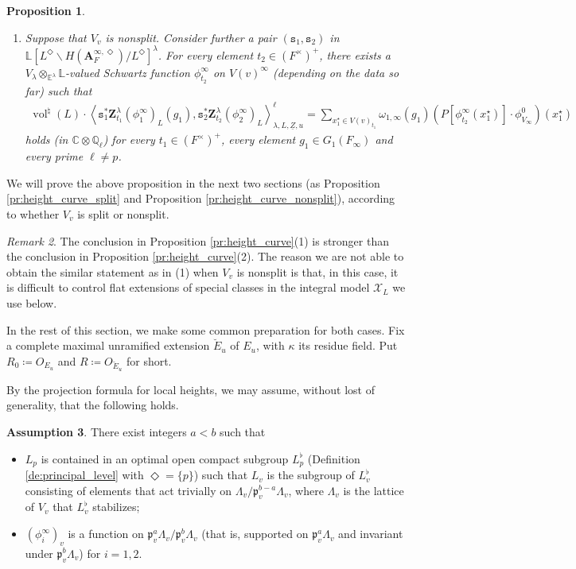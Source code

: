 \documentclass[12pt]{amsart}
\numberwithin{equation}{section}
\theoremstyle{plain}
\newtheorem{proposition}{Proposition}[section]
\theoremstyle{definition}
\newtheorem{assumption}[proposition]{Assumption}
\theoremstyle{remark}
\newtheorem{remark}[proposition]{Remark}
\renewcommand{\b}[1]{\mathbf{#1}}
\renewcommand{\c}[1]{\mathcal{#1}}
\renewcommand{\d}[1]{\mathbb{#1}}
\newcommand{\f}[1]{\mathfrak{#1}}
\renewcommand{\(}{\left(}
\renewcommand{\)}{\right)}
\newcommand{\ul}{\underline}
\newcommand{\bA}{\b A}
\newcommand{\cX}{\c X}
\newcommand{\dC}{\d C}
\newcommand{\dE}{\d E}
\newcommand{\dL}{\d L}
\newcommand{\dQ}{\d Q}
\newcommand{\fp}{\f p}
\newcommand{\ts}{\mathtt{s}}
\newcommand{\bbZ}{\boldsymbol{Z}}
\newcommand{\llangle}{\left\langle}
\newcommand{\rrangle}{\right\rangle}
\DeclareMathOperator{\vol}{vol}
\begin{document}
\begin{proposition}
\begin{enumerate}
  \item Suppose that $V_v$ is nonsplit. Consider further a pair $(\ts_1,\ts_2)$ in $\dL[L^\Diamond\backslash H(\bA_F^{\infty,\Diamond})/L^\Diamond]^\lambda$. For every element $t_2\in(F^\times)^+$, there exists a $V_\lambda\otimes_{\dE^\lambda}\dL$-valued Schwartz function $\phi^\infty_{t_2}$ on $V(v)^\infty$ (depending on the data so far) such that
      \begin{align*}
      \vol^\natural(L)\cdot
      \llangle\ts_1^*\bbZ^\lambda_{t_1}(\phi^\infty_1)_L(g_1),
      \ts_2^*\bbZ^\lambda_{t_2}(\phi^\infty_2)_L\rrangle_{\lambda,L,\ul{Z},u}^\ell
      =\sum_{x^\star_1\in V(v)_{t_1}}\omega_{1,\infty}(g_1)\(P[\phi^\infty_{t_2}(x^\star_1)]\cdot\phi^0_{V_\infty}\)(x^\star_1)
      \end{align*}
      holds (in $\dC\otimes\dQ_\ell$) for every $t_1\in(F^\times)^+$, every element $g_1\in G_1(F_\infty)$ and every prime $\ell\neq p$.
\end{enumerate}
\end{proposition}

We will prove the above proposition in the next two sections (as Proposition \ref{pr:height_curve_split} and Proposition \ref{pr:height_curve_nonsplit}), according to whether $V_v$ is split or nonsplit.


\begin{remark}
The conclusion in Proposition \ref{pr:height_curve}(1) is stronger than the conclusion in Proposition \ref{pr:height_curve}(2). The reason we are not able to obtain the similar statement as in (1) when $V_v$ is nonsplit is that, in this case, it is difficult to control flat extensions of special classes in the integral model $\cX_L$ we use below.
\end{remark}

In the rest of this section, we make some common preparation for both cases. Fix a complete maximal unramified extension $\breve{E}_u$ of $E_u$, with $\kappa$ its residue field. Put $R_0\coloneqq O_{E_u}$ and $R\coloneqq O_{\breve{E}_u}$ for short.

By the projection formula for local heights, we may assume, without lost of generality, that the following holds.

\begin{assumption}\label{as:height_curve}
There exist integers $a<b$ such that
\begin{itemize}
  \item $L_p$ is contained in an optimal open compact subgroup $L_p^\flat$ (Definition \ref{de:principal_level} with $\Diamond=\{p\}$) such that $L_v$ is the subgroup of $L_v^\flat$ consisting of elements that act trivially on $\Lambda_v/\fp_v^{b-a}\Lambda_v$, where $\Lambda_v$ is the lattice of $V_v$ that $L_v^\flat$ stabilizes;

  \item $(\phi^\infty_i)_v$ is a function on $\fp_v^a\Lambda_v/\fp_v^b\Lambda_v$ (that is, supported on $\fp_v^a\Lambda_v$ and invariant under $\fp_v^b\Lambda_v$) for $i=1,2$.
\end{itemize}
\end{assumption}
\end{document}
